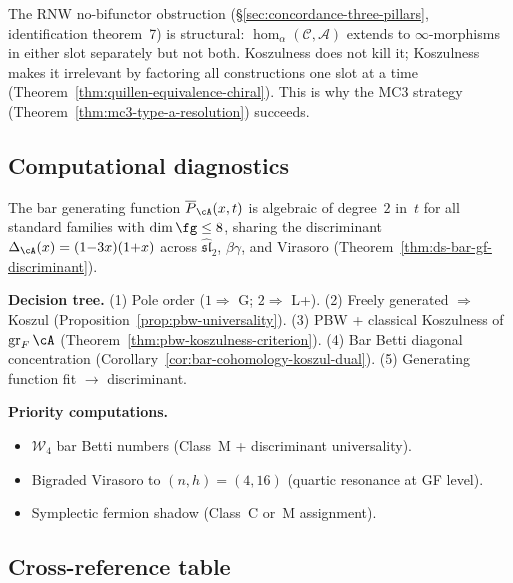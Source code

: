 The RNW no-bifunctor obstruction \cite{RNW19}
(\S\ref{sec:concordance-three-pillars}, identification
theorem~7) is structural: $\operatorname{hom}_\alpha(
\mathcal{C},\mathcal{A})$ extends to $\infty$-morphisms in
either slot separately but not both.  Koszulness does not kill
it; Koszulness makes it irrelevant by factoring all
constructions one slot at a time
(Theorem~\ref{thm:quillen-equivalence-chiral}).  This is why
the MC3 strategy
(Theorem~\ref{thm:mc3-type-a-resolution}) succeeds.
\label{rem:concordance-bifunctor-koszul}


\subsection{Computational diagnostics}
\label{subsec:concordance-computational-diagnostics}

The bar generating function $\overline{P}_\cA(x,t)$ is
algebraic of degree~$2$ in~$t$ for all standard families with
$\dim\fg \le 8$, sharing the discriminant
$\Delta_\cA(x) = (1{-}3x)(1{+}x)$
across $\widehat{\mathfrak{sl}}_2$, $\beta\gamma$, and
Virasoro (Theorem~\ref{thm:ds-bar-gf-discriminant}).

\smallskip\noindent\textbf{Decision tree.}\enspace
(1) Pole order ($1 \Rightarrow$ G; $2 \Rightarrow$ L+).
(2) Freely generated $\Rightarrow$ Koszul (Proposition~\ref{prop:pbw-universality}).
(3) PBW + classical Koszulness of $\operatorname{gr}_F\cA$ (Theorem~\ref{thm:pbw-koszulness-criterion}).
(4) Bar Betti diagonal concentration (Corollary~\ref{cor:bar-cohomology-koszul-dual}).
(5) Generating function fit $\to$ discriminant.

\smallskip\noindent\textbf{Priority computations.}
\begin{itemize}[nosep]
\item $\mathcal{W}_4$ bar Betti numbers (Class~M + discriminant universality).
\item Bigraded Virasoro to $(n,h)=(4,16)$ (quartic resonance at GF level).
\item Symplectic fermion shadow (Class~C or~M assignment).
\end{itemize}


\subsection{Cross-reference table}
\label{subsec:concordance-koszulness-xref}

